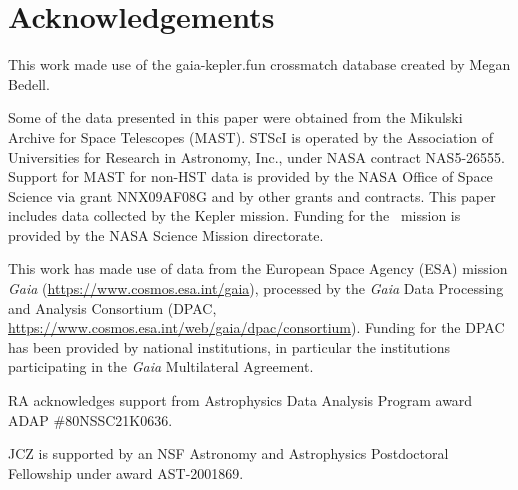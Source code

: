 \section*{Acknowledgements}

This work made use of the gaia-kepler.fun crossmatch database created by Megan
Bedell.

Some of the data presented in this paper were obtained from the Mikulski
Archive for Space Telescopes (MAST).
STScI is operated by the Association of Universities for Research in
Astronomy, Inc., under NASA contract NAS5-26555.
Support for MAST for non-HST data is provided by the NASA Office of Space
Science via grant NNX09AF08G and by other grants and contracts.
This paper includes data collected by the Kepler mission. Funding for the
\Kepler\ mission is provided by the NASA Science Mission directorate.

This work has made use of data from the European Space Agency (ESA) mission
{\it Gaia} (\url{https://www.cosmos.esa.int/gaia}), processed by the {\it
Gaia} Data Processing and Analysis Consortium (DPAC,
\url{https://www.cosmos.esa.int/web/gaia/dpac/consortium}).
Funding for the DPAC has been provided by national institutions, in particular
the institutions participating in the {\it Gaia} Multilateral Agreement.

RA acknowledges support from Astrophysics Data Analysis Program award ADAP
\#80NSSC21K0636.

JCZ is supported by an NSF Astronomy and Astrophysics Postdoctoral Fellowship
under award AST-2001869.



